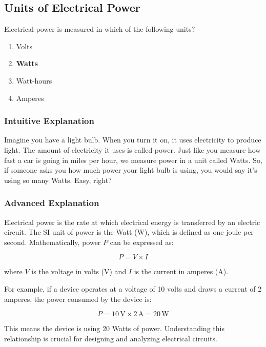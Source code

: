 \subsection{Units of Electrical Power}
\label{T5A02}

\begin{tcolorbox}[colback=gray!10!white,colframe=black!75!black,title=T5A02]
Electrical power is measured in which of the following units?
\begin{enumerate}[label=\Alph*)]
    \item Volts
    \item \textbf{Watts}
    \item Watt-hours
    \item Amperes
\end{enumerate}
\end{tcolorbox}

\subsubsection{Intuitive Explanation}
Imagine you have a light bulb. When you turn it on, it uses electricity to produce light. The amount of electricity it uses is called power. Just like you measure how fast a car is going in miles per hour, we measure power in a unit called Watts. So, if someone asks you how much power your light bulb is using, you would say it's using so many Watts. Easy, right?

\subsubsection{Advanced Explanation}
Electrical power is the rate at which electrical energy is transferred by an electric circuit. The SI unit of power is the Watt (W), which is defined as one joule per second. Mathematically, power \( P \) can be expressed as:

\[
P = V \times I
\]

where \( V \) is the voltage in volts (V) and \( I \) is the current in amperes (A). 

For example, if a device operates at a voltage of 10 volts and draws a current of 2 amperes, the power consumed by the device is:

\[
P = 10 \, \text{V} \times 2 \, \text{A} = 20 \, \text{W}
\]

This means the device is using 20 Watts of power. Understanding this relationship is crucial for designing and analyzing electrical circuits.

